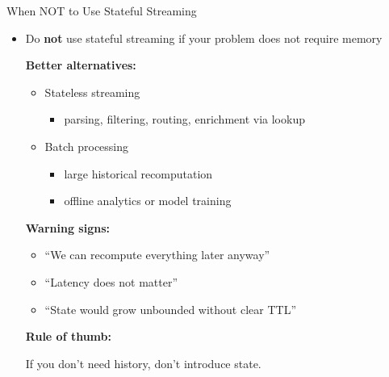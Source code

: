 \documentclass[aspectratio=169]{beamer}
\begin{document}
\begin{frame}{When NOT to Use Stateful Streaming}
\begin{itemize}
    \item Do \textbf{not} use stateful streaming if your problem does not require memory

    \vspace{0.2cm}
    \textbf{Better alternatives:}
    \begin{itemize}
        \item Stateless streaming
        \begin{itemize}
            \item parsing, filtering, routing, enrichment via lookup
        \end{itemize}
        \item Batch processing
        \begin{itemize}
            \item large historical recomputation
            \item offline analytics or model training
        \end{itemize}
    \end{itemize}

    \vspace{0.3cm}
    \textbf{Warning signs:}
    \begin{itemize}
        \item ``We can recompute everything later anyway''
        \item ``Latency does not matter''
        \item ``State would grow unbounded without clear TTL''
    \end{itemize}

    \vspace{0.3cm}
    \textbf{Rule of thumb:}
    \begin{block}{}
    If you don’t need history, don’t introduce state.
    \end{block}
\end{itemize}
\end{frame}
\end{document}
